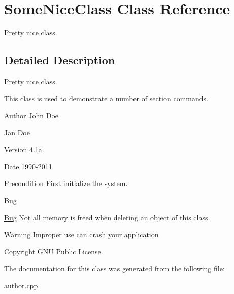 \hypertarget{classSomeNiceClass}{\section{Some\-Nice\-Class Class Reference}
\label{classSomeNiceClass}
}


Pretty nice class.  




\subsection{Detailed Description}
Pretty nice class. 

This class is used to demonstrate a number of section commands. \begin{DoxyAuthor}{Author}
John Doe 

Jan Doe 
\end{DoxyAuthor}
\begin{DoxyVersion}{Version}
4.\-1a 
\end{DoxyVersion}
\begin{DoxyDate}{Date}
1990-\/2011 
\end{DoxyDate}
\begin{DoxyPrecond}{Precondition}
First initialize the system. 
\end{DoxyPrecond}
\begin{DoxyRefDesc}{Bug}
\item[\hyperlink{bug__bug000001}{Bug}]Not all memory is freed when deleting an object of this class. \begin{DoxyWarning}{Warning}
Improper use can crash your application 
\end{DoxyWarning}
\begin{DoxyCopyright}{Copyright}
G\-N\-U Public License. 
\end{DoxyCopyright}
\end{DoxyRefDesc}


The documentation for this class was generated from the following file\-:\begin{DoxyCompactItemize}
\item 
author.\-cpp\end{DoxyCompactItemize}
